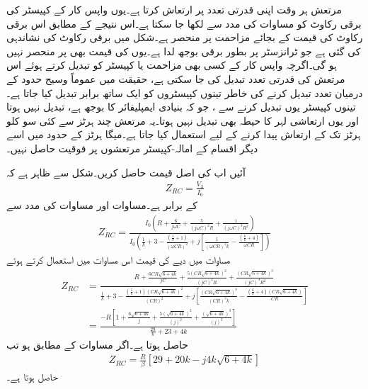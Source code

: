 مرتعش ہر وقت اپنی قدرتی تعدد پر ارتعاش کرتا ہے۔یوں واپس کار کے کپیسٹر کی برقی رکاوٹ  کو مساوات  کی مدد سے  لکھا جا سکتا ہے۔اس نتیجے کے مطابق اس برقی رکاوٹ کی قیمت  کے بجائے مزاحمت  پر منحصر ہے۔شکل  میں برقی رکاوٹ  کی نشاندہی کی گئی ہے جو ٹرانزسٹر پر بطور برقی بوجھ لدا ہے۔یوں  کی قیمت بھی  پر منحصر نہیں ہو گی۔اگرچہ واپس کار کے کسی بھی مزاحمت یا کپیسٹر کو تبدیل کرتے ہوئے اس مرتعش کی قدرتی تعدد تبدیل کی جا سکتی ہے، حقیقت میں عموماً وسیح حدود کے درمیان تعدد تبدیل کرنے کی خاطر تینوں کپیسٹروں کو ایک ساتھ برابر تبدیل کیا جاتا ہے۔تینوں کپیسٹر یوں تبدیل کرنے سے  ، جو کہ بنیادی ایمپلیفائر کا بوجھ ہے، تبدیل نہیں ہوتا اور یوں ارتعاشی لہر کا حیطہ بھی تبدیل نہیں ہوتا۔یہ مرتعش چند ہرٹز  سے کئی سو کلو ہرٹز   تک کے ارتعاش پیدا کرنے کے لیے استعمال کیا جاتا ہے۔میگا ہرٹز  کے حدود میں اسے دیگر اقسام کے امالہ-کپیسٹر  مرتعشوں پر فوقیت حاصل نہیں۔

آئیں اب  کی اصل قیمت حاصل کریں۔شکل سے ظاہر ہے کہ
\begin{align*}
Z_{RC}=\frac{V_3}{I_6}
\end{align*}
کے برابر ہے۔مساوات  اور مساوات  کی مدد سے
\begin{align*}
Z_{RC}=\frac{I_0 \left(R+\frac{6}{j \omega C}+\frac{5}{\left(j \omega C \right )^2 R} +\frac{1}{\left(j \omega C \right )^3 R^2}\right)}{I_0 \left( \frac{1}{k}+3 -\frac{\left(\frac{5}{k}+1 \right )}{\left(\omega C R \right)^2}+j \left [\frac{1}{\left (\omega C R \right)^3 k}  -\frac{\left(\frac{6}{k}+4 \right)}{\omega C R}\right] \right )}
\end{align*}
مساوات  میں دیے  کی قیمت اس مساوات میں استعمال کرتے ہوئے
\begin{align*}
Z_{RC}&=\frac{ R+\frac{6 CR\sqrt{6+4k}}{j C}+\frac{5 \left(CR\sqrt{6+4k} \right)^2}{\left(j C \right )^2 R} +\frac{\left(CR\sqrt{6+4k} \right)^3}{\left(j C \right )^3 R^2}}{  \frac{1}{k}+3 -\frac{\left(\frac{5}{k}+1 \right ) \left(CR\sqrt{6+4k} \right)^2}{\left( C R \right)^2}+j \left [\frac{\left(CR\sqrt{6+4k} \right)^3}{\left (C R \right)^3 k}  -\frac{\left(\frac{6}{k}+4 \right)\left(CR\sqrt{6+4k} \right)}{C R}\right] }\\
&=\frac{-R \left[ 1+\frac{6\sqrt{6+4k}}{j }+\frac{5 \left(\sqrt{6+4k} \right)^2}{\left(j \right )^2} +\frac{\left(\sqrt{6+4k} \right)^3}{\left(j \right )^3} \right]}{\frac{29}{k}+23 +4k}
\end{align*}
حاصل ہوتا ہے۔اگر   مساوات  کے مطابق ہو تب
\begin{align}
Z_{RC}=\frac{R}{\beta} \left[ 29+20k -j 4 k \sqrt{6+4k}\right]
\end{align}
حاصل ہوتا ہے۔

